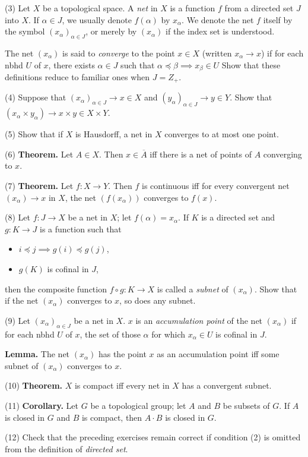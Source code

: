 \documentclass[a4paper]{article}
\begin{document}
(3) Let $X$ be a topological space. A \emph{net} in $X$ is a function $f$ from a directed set $J$ into $X$. If $\alpha \in J$, we usually denote $f(\alpha)$ by $x_\alpha$. We denote the net $f$ itself by the symbol $(x_\alpha)_{\alpha \in J}$, or merely by $(x_\alpha)$ if the index set is understood.

The net $(x_\alpha)$ is said to \emph{converge} to the point $x \in X$ (written $x_\alpha \to x$) if for each nbhd $U$ of $x$, there exists $\alpha \in J$ such that $\alpha \preceq \beta \implies x_\beta \in U$ Show that these definitions reduce to familiar ones when $J = Z_+$.

(4) Suppose that $(x_\alpha)_{\alpha \in J} \to x \in X$ and $(y_\alpha)_{\alpha \in J} \to y \in Y$. Show that $(x_\alpha \times y_\alpha) \to x \times y \in X \times Y$.

(5) Show that if $X$ is Hausdorff, a net in $X$ converges to at most one point.

(6) \textbf{Theorem.} Let $A \in X$. Then $x \in \overline{A}$ iff there is a net of points of $A$ converging to $x$.

(7) \textbf{Theorem.} Let $f : X \to Y$. Then $f$ is continuous iff for every convergent net $(x_\alpha) \to x$ in $X$, the net $(f(x_\alpha))$ converges to $f(x)$.

(8) Let $f : J \to X$ be a net in $X$; let $f(\alpha) = x_\alpha$. If $K$ is a directed set and $g : K \to J$ is a function such that

\begin{itemize}
    \item $i \preceq j \implies g(i) \preceq g(j)$,
    \item $g(K)$ is cofinal in $J$,
\end{itemize}

then the composite function $f \circ g : K \to X$ is called a \emph{subnet} of $(x_\alpha)$. Show that if the net $(x_\alpha)$ converges to $x$, so does any subnet.

(9) Let $(x_\alpha)_{\alpha \in J}$ be a net in $X$. $x$ is an \emph{accumulation point} of the net $(x_\alpha)$ if for each nbhd $U$ of $x$, the set of those $\alpha$ for which $x_\alpha \in U$ is cofinal in $J$.

\textbf{Lemma.} The net $(x_\alpha)$ has the point $x$ as an accumulation point iff some subnet of $(x_\alpha)$ converges to $x$.

(10) \textbf{Theorem.} $X$ is compact iff every net in $X$ has a convergent subnet.

(11) \textbf{Corollary.} Let $G$ be a topological group; let $A$ and $B$ be subsets of $G$. If $A$ is closed in $G$ and $B$ is compact, then $A \cdot B$ is closed in $G$.

(12) Check that the preceding exercises remain correct if condition (2) is omitted from the definition of \emph{directed set}.
\end{document}
